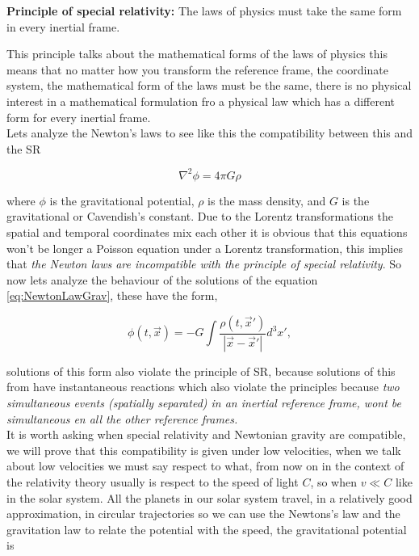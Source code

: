         \begin{myPrinciple}
            \textbf{Principle of special relativity:} The laws of physics must take the same form in every inertial frame.
        \end{myPrinciple}

        This principle talks about the mathematical forms of the laws of physics this means that no matter how you transform the reference frame, the coordinate system, the mathematical form of the laws must be the same, there is no physical interest in a mathematical formulation fro a physical law which has a different form for every inertial frame.\\

        Lets analyze the Newton's laws to see like this the compatibility between this and the SR

        \begin{equation}\label{eq:NewtonLawGrav}
            \nabla^2 \phi = 4\pi G\rho
        \end{equation}

        where $\phi$ is the gravitational potential, $\rho$ is the mass density, and $G$ is the gravitational or Cavendish's constant. Due to the Lorentz transformations the spatial and temporal coordinates mix each other it is obvious that this equations won't be longer a Poisson equation under a Lorentz transformation, this implies that \textit{the Newton laws are incompatible with the principle of special relativity}.  So now lets analyze the behaviour of the solutions of the equation \ref{eq:NewtonLawGrav}, these have the form,

        \begin{equation}
            \phi(t,\Vec{x}) = -G\int \frac{\rho(t,\Vec{x}')}{|\Vec{x}-\Vec{x}'|}d^3x',
        \end{equation}

        solutions of this form also violate the principle of SR, because solutions of this from have instantaneous reactions which also violate the principles because \textit{two simultaneous events (spatially separated) in an inertial reference frame, wont be simultaneous en all the other reference frames.}\\

        It is worth asking when special relativity and Newtonian gravity are compatible, we will prove that this compatibility is given under low velocities, when we talk about low velocities we must say respect to what, from now on in the context of the relativity theory usually is respect to the speed of light $C$, so when $v \ll C$ like in the solar system. All the planets in our solar system travel, in a relatively good approximation, in circular trajectories so we can use the Newtons's law and the gravitation law to relate the potential with the speed, the gravitational potential is

